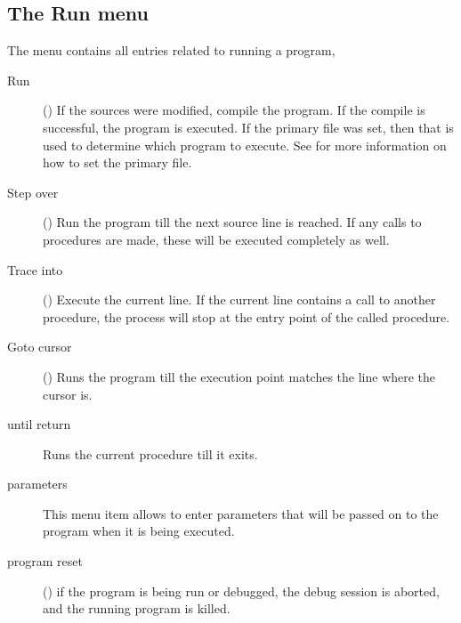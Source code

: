 \subsection{The Run menu}
\label{se:menurun}
The  menu contains all entries related to running a program,
\begin{description}
\item[Run] ()
If the sources were modified, compile the program. If the compile is
successful, the program is executed. If the primary file  was set, then 
that is used to determine which program to execute. See 
for more information on how to set the primary file.
\item[Step over] ()
Run the program till the next source line is reached. If any calls to 
procedures are made, these will be executed completely as well.
\item[Trace into] ()
Execute the current line. If the current line contains a call to another
procedure, the process will stop at the entry point of the called procedure.
\item[Goto cursor] ()
Runs the program till the execution point matches the line where the cursor
is.
\item[until return]
Runs the current procedure till it exits.
\item[parameters]
This menu item allows to enter parameters that will be passed on to the
program when it is being executed.
\item[program reset] () if the program is being run or 
debugged, the debug session is aborted, and the running program is killed.
\end{description}
%
%
